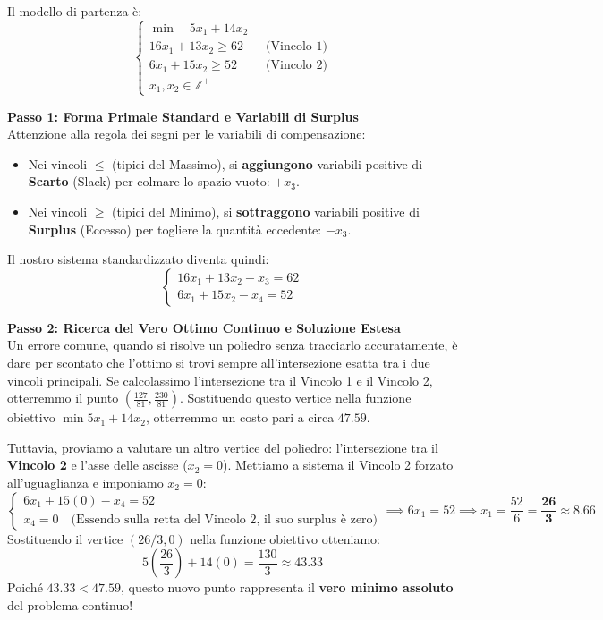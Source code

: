 \documentclass[12pt, a4paper]{article}
\begin{document}
	Il modello di partenza è:
	\[
	\begin{cases}
		\min \quad 5x_1 + 14x_2 \\[6pt]
		16x_1 + 13x_2 \geq 62 \quad &\text{(Vincolo 1)} \\
		6x_1 + 15x_2 \geq 52 \quad &\text{(Vincolo 2)} \\[6pt]
		x_1, x_2 \in \mathbb{Z}^+
	\end{cases}
	\]
	
	\textbf{Passo 1: Forma Primale Standard e Variabili di Surplus}\\
	Attenzione alla regola dei segni per le variabili di compensazione:
	\begin{itemize}[label=\textcolor{titlecolor}{\Large\textbullet}, itemsep=2pt, leftmargin=1.5cm]
		\item Nei vincoli $\leq$ (tipici del Massimo), si \textbf{aggiungono} variabili positive di \textbf{Scarto} (Slack) per colmare lo spazio vuoto: $+x_3$.
		\item Nei vincoli $\geq$ (tipici del Minimo), si \textbf{sottraggono} variabili positive di \textbf{Surplus} (Eccesso) per togliere la quantità eccedente: $-x_3$.
	\end{itemize}
	Il nostro sistema standardizzato diventa quindi:
	\[
	\begin{cases}
		16x_1 + 13x_2 - x_3 = 62 \\
		6x_1 + 15x_2 - x_4 = 52
	\end{cases}
	\]
	
	\textbf{Passo 2: Ricerca del Vero Ottimo Continuo e Soluzione Estesa}\\
	Un errore comune, quando si risolve un poliedro senza tracciarlo accuratamente, è dare per scontato che l'ottimo si trovi sempre all'intersezione esatta tra i due vincoli principali. Se calcolassimo l'intersezione tra il Vincolo 1 e il Vincolo 2, otterremmo il punto $\left(\frac{127}{81}, \frac{230}{81}\right)$. Sostituendo questo vertice nella funzione obiettivo $\min 5x_1 + 14x_2$, otterremmo un costo pari a circa $47.59$. 
	
	Tuttavia, proviamo a valutare un altro vertice del poliedro: l'intersezione tra il \textbf{Vincolo 2} e l'asse delle ascisse ($x_2 = 0$). 
	Mettiamo a sistema il Vincolo 2 forzato all'uguaglianza e imponiamo $x_2 = 0$:
	\[
	\begin{cases}
		6x_1 + 15(0) - x_4 = 52 \\
		x_4 = 0 \quad \text{(Essendo sulla retta del Vincolo 2, il suo surplus è zero)}
	\end{cases}
	\implies 6x_1 = 52 \implies x_1 = \frac{52}{6} = \mathbf{\frac{26}{3}} \approx 8.66
	\]
	Sostituendo il vertice $(26/3, 0)$ nella funzione obiettivo otteniamo:
	\[
	5\left(\frac{26}{3}\right) + 14(0) = \frac{130}{3} \approx 43.33
	\]
	Poiché $43.33 < 47.59$, questo nuovo punto rappresenta il \textbf{vero minimo assoluto} del problema continuo!
	
\end{document}
